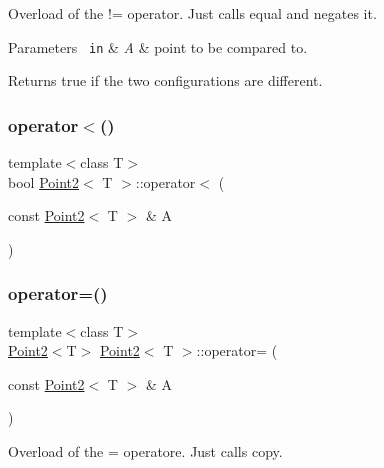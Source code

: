 Overload of the != operator. Just calls {\ttfamily equal} and negates it. 


\begin{DoxyParams}[1]{Parameters}
\mbox{\texttt{ in}}  & {\em A} & point to be compared to. \\
\hline
\end{DoxyParams}
\begin{DoxyReturn}{Returns}
true if the two configurations are different. 
\end{DoxyReturn}
\mbox{\label{class_point2_a636a84c47519a482cfce43039e981dff}} 
\subsubsection{\texorpdfstring{operator$<$()}{operator<()}}
{\footnotesize\ttfamily template$<$class T$>$ \\
bool \mbox{\hyperlink{class_point2}{Point2}}$<$ T $>$\+::operator$<$ (\begin{DoxyParamCaption}\item[{const \mbox{\hyperlink{class_point2}{Point2}}$<$ T $>$ \&}]{A }\end{DoxyParamCaption})\hspace{0.3cm}{\ttfamily [inline]}}

\mbox{\label{class_point2_af715722f2b04def60eb23f291e31c4d8}} 
\subsubsection{\texorpdfstring{operator=()}{operator=()}}
{\footnotesize\ttfamily template$<$class T$>$ \\
\mbox{\hyperlink{class_point2}{Point2}}$<$T$>$ \mbox{\hyperlink{class_point2}{Point2}}$<$ T $>$\+::operator= (\begin{DoxyParamCaption}\item[{const \mbox{\hyperlink{class_point2}{Point2}}$<$ T $>$ \&}]{A }\end{DoxyParamCaption})\hspace{0.3cm}{\ttfamily [inline]}}



Overload of the = operatore. Just calls {\ttfamily copy}. 


